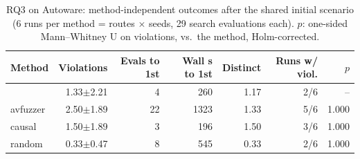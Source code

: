 \begin{table}[t]
\centering
\small
\caption{RQ3 on Autoware: method-independent outcomes after the shared initial scenario (6 runs per method = routes $\times$ seeds, 29 search evaluations each). $p$: one-sided Mann--Whitney U on violations, \toolname{} vs.\ the method, Holm-corrected.}
\label{tab:rq3-results}
\begin{tabular}{@{}lrrrrrr@{}}
\toprule
Method & Violations & Evals to 1st & Wall s to 1st & Distinct & Runs w/ viol. & $p$ \\
\midrule
\toolname{} & 1.33$\pm$2.21 & 4 & 260 & 1.17 & 2/6 & -- \\
avfuzzer & 2.50$\pm$1.89 & 22 & 1323 & 1.33 & 5/6 & 1.000 \\
causal & 1.50$\pm$1.89 & 3 & 196 & 1.50 & 3/6 & 1.000 \\
random & 0.33$\pm$0.47 & 8 & 545 & 0.33 & 2/6 & 1.000 \\
\bottomrule
\end{tabular}
\end{table}
